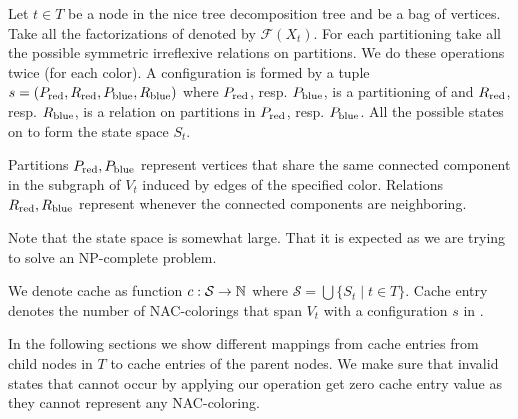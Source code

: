 %
\begin{definition}
	Let \( t \in T \) be a node in the nice tree decomposition tree and
	\Xt{} be a bag of vertices.
	Take all the factorizations of \Xt{} denoted by \( \mathcal{F}(X_t) \).
	For each partitioning take all the possible
	symmetric irreflexive relations on partitions.
	We do these operations twice (for each color).
	A configuration is formed by a tuple \( s = (P_{\text{red}}, R_{\text{red}}, P_{\text{blue}}, R_{\text{blue}}) \)
	where \( P_{\text{red}}\), resp. \( P_{\text{blue}} \), is a partitioning of \Xt{}
	and \( R_{\text{red}}\), resp. \(R_{\text{blue}} \), is a relation
	on partitions in \( P_{\text{red}}\), resp. \(P_{\text{blue}} \).
	All the possible states on \Xt{} to form the state space \( S_t \).
\end{definition}
%
Partitions \( P_{\text{red}}, P_{\text{blue}} \) represent vertices
that share the same connected component in the subgraph of \( V_t \)
induced by edges of the specified color.
Relations \( R_{\text{red}}, R_{\text{blue}} \) represent
whenever the connected components are neighboring.

Note that the state space is somewhat large.
That it is expected as we are trying to solve an NP-complete problem.

We denote cache as function \( c: \mathcal{S} \to \mathbb{N} \)
where \( \mathcal{S} = \bigcup\{S_t \mid t \in T\} \).
Cache entry denotes the number of NAC-colorings
that span \( V_t \) with a configuration \( s \) in \Xt{}.

In the following sections we show different mappings from cache entries
from child nodes in \( T \) to cache entries of the parent nodes.
We make sure that invalid states that cannot occur by applying our operation
get zero cache entry value as they cannot represent any NAC-coloring.


\subsection{\IntroduceVertexNode}

